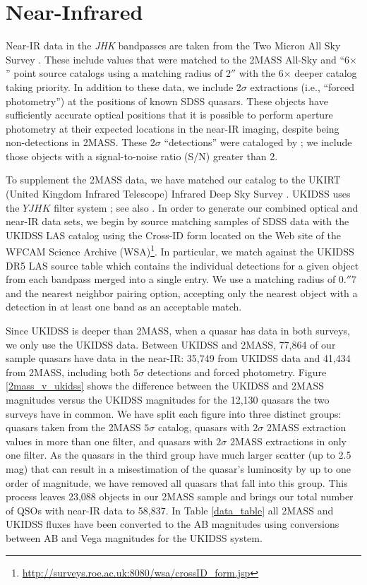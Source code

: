 

\section{Near-Infrared}

Near-IR data in the {\em JHK} bandpasses are taken from the Two Micron All Sky Survey \citep[2MASS;][]{Skrutskie:2006}.  These include values that were matched to the 2MASS All-Sky and ``6$\times$'' point source catalogs using a matching radius of $2''$ with the 6$\times$ deeper catalog taking priority.  In addition to these data, we include 2$\sigma$ extractions (i.e., ``forced photometry'') at the positions of known SDSS quasars.  These objects have sufficiently accurate optical positions that it is possible to perform aperture photometry at their expected locations in the near-IR imaging, despite being non-detections in 2MASS.  These 2$\sigma$ ``detections'' were cataloged by \citet{Schneider:2010}; we include those objects with a signal-to-noise ratio (S/N) greater than 2.

To supplement the 2MASS data, we have matched our catalog to the UKIRT (United Kingdom Infrared Telescope) Infrared Deep Sky Survey \citep[UKIDSS; ][]{Lawrence:2007}. UKIDSS uses the $YJHK$ filter system \citep{Hewett:2006}; see also \citet{Peth:2011}.  
In order to generate our combined optical and near-IR data sets, we begin by source matching samples of SDSS data with the UKIDSS LAS catalog using the Cross-ID form located on the Web site of the WFCAM Science Archive (WSA)\footnote{\url{http://surveys.roe.ac.uk:8080/wsa/crossID\_form.jsp}}. In particular, we match against the UKIDSS DR5 LAS source table which contains the individual detections for a given object from each bandpass merged into a single entry.
We use a matching radius of 0.\hspace{-.2em}$''$7 and the nearest neighbor pairing option, accepting only the nearest object with a detection in at least one band as an acceptable match.

Since UKIDSS is deeper than 2MASS, when a quasar has data in both surveys, we only use the UKIDSS data. Between UKIDSS and 2MASS, 77,864 of our sample quasars have data in the near-IR: 35,749 from UKIDSS data and 41,434 from 2MASS, including both $5\sigma$ detections and forced photometry. Figure \ref{2mass_v_ukidss} shows the difference between the UKIDSS and 2MASS magnitudes versus the UKIDSS magnitudes for the 12,130 quasars the two surveys have in common.  We have split each figure into three distinct groups: quasars taken from the 2MASS $5\sigma$ catalog, quasars with $2\sigma$ 2MASS extraction values in more than one filter, and quasars with $2\sigma$ 2MASS extractions in only one filter.  As the quasars in the third group have much larger scatter (up to 2.5 mag) that can result in a misestimation of the quasar's luminosity by up to one order of magnitude,
we have removed all quasars that fall into this group.  This process leaves 23,088 objects in our 2MASS sample and brings our total number of QSOs with near-IR data to 58,837. 
In Table \ref{data_table} all 2MASS and UKIDSS fluxes have been converted to the AB magnitudes using \citet{Hewett:2006} conversions between AB and Vega magnitudes for the UKIDSS system.

